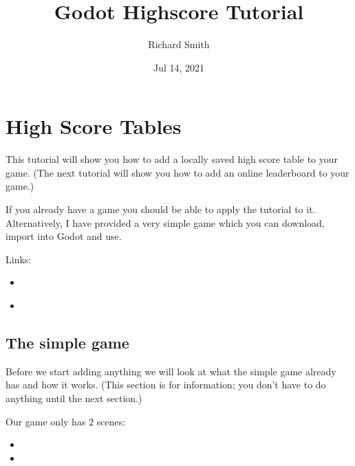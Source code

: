 \documentclass[a4paper,12pt,english]{sphinxmanual}
\title{Godot Highscore Tutorial}
\date{Jul 14, 2021}
\author{Richard Smith}
\begin{document}
\pagestyle{empty}
\sphinxmaketitle
\pagestyle{plain}
\sphinxtableofcontents
\pagestyle{normal}
\label{\detokenize{index::doc}}



\chapter{High Score Tables}
\label{\detokenize{tutorial:high-score-tables}}\label{\detokenize{tutorial::doc}}
\sphinxAtStartPar
This tutorial will show you how to add a locally saved high score table
to your game. (The next tutorial will show you how to add an online
leaderboard to your game.)

\sphinxAtStartPar
If you already have a game you should be able to apply the tutorial to
it. Alternatively, I have provided a very simple game which you can
download, import into Godot and use.

\sphinxAtStartPar
Links:
\begin{itemize}
\item {} 
\sphinxAtStartPar
{}%
\begin{footnote}[1]\sphinxAtStartFootnote
{}
%
\end{footnote}

\item {} 
\sphinxAtStartPar
{}%
\begin{footnote}[2]\sphinxAtStartFootnote
{}
%
\end{footnote}

\end{itemize}


\section{The simple game}
\label{\detokenize{tutorial:the-simple-game}}
\sphinxAtStartPar
Before we start adding anything we will look at what the simple game
already has and how it works. (This section is for information; you
don’t have to do anything until the next section.)

\sphinxAtStartPar
Our game only has 2 scenes:
\begin{itemize}
\item {} 
\sphinxAtStartPar
{}

\item {} 
\sphinxAtStartPar
{}

\end{itemize}
\end{document}

